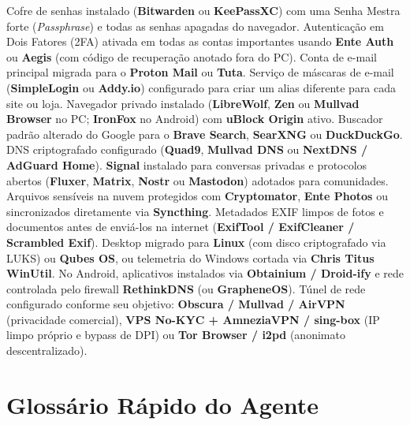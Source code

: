 \documentclass{pousadaguide}
\begin{document}
\begin{checklist}
  \feito Cofre de senhas instalado (\textbf{Bitwarden} ou \textbf{KeePassXC}) com uma Senha Mestra forte (\emph{Passphrase}) e todas as senhas apagadas do navegador.
  \feito Autenticação em Dois Fatores (2FA) ativada em todas as contas importantes usando \textbf{Ente Auth} ou \textbf{Aegis} (com código de recuperação anotado fora do PC).
  \feito Conta de e-mail principal migrada para o \textbf{Proton Mail} ou \textbf{Tuta}.
  \feito Serviço de máscaras de e-mail (\textbf{SimpleLogin} ou \textbf{Addy.io}) configurado para criar um alias diferente para cada site ou loja.
  \feito Navegador privado instalado (\textbf{LibreWolf}, \textbf{Zen} ou \textbf{Mullvad Browser} no PC; \textbf{IronFox} no Android) com \textbf{uBlock Origin} ativo.
  \feito Buscador padrão alterado do Google para o \textbf{Brave Search}, \textbf{SearXNG} ou \textbf{DuckDuckGo}.
  \feito DNS criptografado configurado (\textbf{Quad9}, \textbf{Mullvad DNS} ou \textbf{NextDNS / AdGuard Home}).
  \feito \textbf{Signal} instalado para conversas privadas e protocolos abertos (\textbf{Fluxer}, \textbf{Matrix}, \textbf{Nostr} ou \textbf{Mastodon}) adotados para comunidades.
  \opcional Arquivos sensíveis na nuvem protegidos com \textbf{Cryptomator}, \textbf{Ente Photos} ou sincronizados diretamente via \textbf{Syncthing}.
  \opcional Metadados EXIF limpos de fotos e documentos antes de enviá-los na internet (\textbf{ExifTool / ExifCleaner / Scrambled Exif}).
  \opcional Desktop migrado para \textbf{Linux} (com disco criptografado via LUKS) ou \textbf{Qubes OS}, ou telemetria do Windows cortada via \textbf{Chris Titus WinUtil}.
  \opcional No Android, aplicativos instalados via \textbf{Obtainium / Droid-ify} e rede controlada pelo firewall \textbf{RethinkDNS} (ou \textbf{GrapheneOS}).
  \opcional Túnel de rede configurado conforme seu objetivo: \textbf{Obscura / Mullvad / AirVPN} (privacidade comercial), \textbf{VPS No-KYC + AmneziaVPN / sing-box} (IP limpo próprio e bypass de DPI) ou \textbf{Tor Browser / i2pd} (anonimato descentralizado).
\end{checklist}

\clearpage
\section{Glossário Rápido do Agente}
\end{document}
